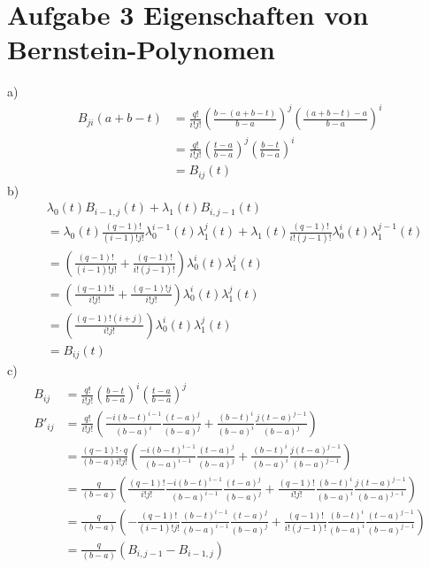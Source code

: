 
\section*{Aufgabe 3 Eigenschaften von Bernstein-Polynomen}
a)
\begin{align}
	B_{ji}(a+b-t) &= \frac{q!}{i!j!} \left(\frac{b-(a+b-t)}{b-a}\right)^j \left(\frac{(a+b-t)-a}{b-a}\right)^i \\
	&= \frac{q!}{i!j!} \left(\frac{t-a}{b-a}\right)^j \left(\frac{b-t}{b-a}\right)^i\\
	&= B_{ij}(t)
\end{align}
b)
\begin{align}
	& \lambda_0(t) B_{i-1,j}(t) + \lambda_1(t) B_{i,j-1}(t)\\
	&= \lambda_0(t) \frac{(q-1)!}{(i-1)!j!} \lambda_0^{i-1}(t) \lambda_1^{j}(t) + \lambda_1(t) \frac{(q-1)!}{i!(j-1)!} \lambda_0^{i}(t) \lambda_1^{j-1}(t)\\
	&= \left(\frac{(q-1)!}{(i-1)!j!} +\frac{(q-1)!}{i!(j-1)!} \right) \lambda_0^i(t)\lambda_1^{j}(t) \\
	&= \left(\frac{(q-1)!i}{i!j!} +\frac{(q-1)!j}{i!j!} \right)  \lambda_0^i(t)\lambda_1^{j}(t)\\
	&= \left(\frac{(q-1)!(i+j)}{i!j!} \right) \lambda_0^i(t)\lambda_1^{j}(t)\\
	&= B_{ij}(t)
\end{align}
c)
\begin{align}
	B_{ij} &= \frac{q!}{i!j!} \left(\frac{b-t}{b-a}\right)^i \left(\frac{t-a}{b-a}\right)^j \\
	B'_{ij} &= \frac{q!}{i!j!} \left(\frac{-i(b-t)^{i-1}}{(b-a)^i} \frac{(t-a)^{j}}{(b-a)^j} + \frac{(b-t)^{i}}{(b-a)^i} \frac{j(t-a)^{j-1}}{(b-a)^j} \right)\\
	&= \frac{(q-1)!\cdot q}{(b-a) i! j!} \left(\frac{-i(b-t)^{i-1}}{(b-a)^{i-1}} \frac{(t-a)^{j}}{(b-a)^j} + \frac{(b-t)^{i}}{(b-a)^i} \frac{j(t-a)^{j-1}}{(b-a)^{j-1}} \right)\\
	&= \frac{q}{(b-a)} \left(\frac{(q-1)!}{i!j!}\frac{-i(b-t)^{i-1}}{(b-a)^{i-1}} \frac{(t-a)^{j}}{(b-a)^j} + \frac{(q-1)!}{i!j!}\frac{(b-t)^{i}}{(b-a)^i} \frac{j(t-a)^{j-1}}{(b-a)^{j-1}} \right)\\
	&= \frac{q}{(b-a)} \left(- \frac{(q-1)!}{(i-1)!j!}\frac{(b-t)^{i-1}}{(b-a)^{i-1}} \frac{(t-a)^{j}}{(b-a)^j} + \frac{(q-1)!}{i!(j-1)!}\frac{(b-t)^{i}}{(b-a)^i} \frac{(t-a)^{j-1}}{(b-a)^{j-1}} \right)\\
	&= \frac{q}{(b-a)} \left( B_{i,j-1} - B_{i-1,j} \right) 
\end{align}

